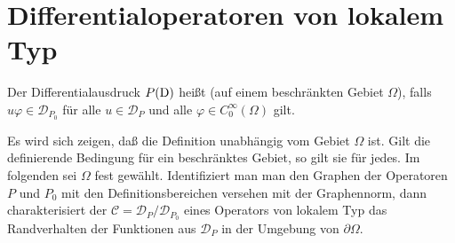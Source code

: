 \section{Differentialoperatoren von lokalem Typ} %
\begin{df}
Der Differentialausdruck $P(\mathrm D)$ heißt  (auf einem beschränkten Gebiet $\Omega$), falls $u\varphi\in\mathcal D_{P_0}$ für alle $u\in\mathcal D_{P}$ und alle $\varphi\in C_0^\infty(\Omega)$ gilt.
\end{df}
Es wird sich zeigen, daß die Definition unabhängig vom Gebiet $\Omega$ ist. Gilt die definierende Bedingung für ein beschränktes Gebiet, so gilt sie für jedes. Im folgenden sei $\Omega$ fest gewählt. Identifiziert man man den Graphen der Operatoren $P$ und $P_0$ mit den Definitionsbereichen versehen mit der Graphennorm, dann charakterisiert der  $\mathcal C = \mathcal D_{P}/\mathcal D_{P_0}$ eines Operators von lokalem Typ das Randverhalten der Funktionen aus $\mathcal D_{P}$ in der Umgebung von $\partial\Omega$.



